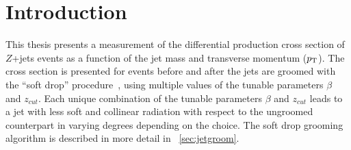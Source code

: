 
\chapter{Introduction}\label{sec:intro}




This thesis presents a measurement of the differential production cross section
of $Z$+jets events as a function of the jet mass and transverse
momentum ($p_{\mathrm{T}}$). The cross section is presented for events before
and after the jets are groomed with the ``soft drop''
procedure~\cite{softdrop}, using multiple values of the tunable parameters $\beta$ and $z_{cut}$. Each unique combination of the tunable parameters $\beta$ and $z_{cut}$ leads to a jet with less soft and collinear radiation with respect to the ungroomed counterpart in varying degrees depending on the choice. The soft drop grooming algorithm is described in more detail in ~\ref{sec:jetgroom}.


